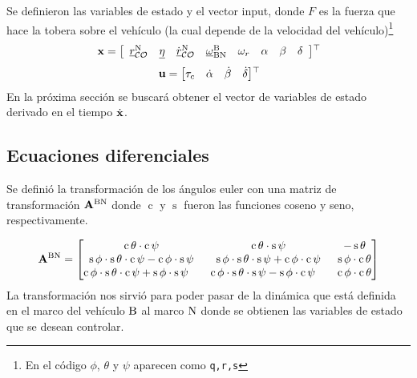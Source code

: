 \medskip

Se definieron las variables de estado y el vector input, donde $F$ es la fuerza que hace la tobera sobre el vehículo (la cual depende de la velocidad del vehículo)\footnote{En el código $\phi$, $\theta$ y $\psi$ aparecen como \texttt{q,r,s}}
\begin{equation} \label{eq:ssVariables3D}
	\mathbf{x} = \left[
	\begin{array}{cccccccc}
		{ \underline{r} }_{\mathcal{CO}}^{\mathrm{N}} & { \underline{\eta} } &\dot{{ \underline{r} }}_{\mathcal{CO}}^{\mathrm{N}} &  { \underline{\omega} }_{\mathrm{BN}}^{\mathrm{B}} & \omega_r & \alpha & \beta & \delta
	\end{array}\right] \!^{\top}\!
\end{equation}
\begin{equation}\label{eq:ssInputs3D}
	\mathbf{u} = \begin{bmatrix}
		\tau_c & \dot{\alpha} & \dot{\beta} & \dot{\delta}
	\end{bmatrix} \!^{\top}\!
\end{equation}
En la próxima sección se buscará obtener el vector de variables de estado derivado en el tiempo $\dot{\mathbf{x}}$.

\subsection{Ecuaciones diferenciales} \label{subsec:modeloMatematico}

\def\scos{\operatorname{c}}
\def\ssin{\operatorname{s}}
Se definió la transformación de los ángulos euler con una matriz de transformación $\mathbf{A}^{\mathrm{BN}}$ donde $\scos$ y $\ssin$ fueron las funciones coseno y seno, respectivamente.

\begin{equation} \label{eq:matrizTransfoVehiculo}
	\transform{BN} = \begin{bmatrix}
	\scos \theta \cdot \scos \psi & \scos \theta \cdot \ssin \psi & - \ssin \theta \\
	\ssin \phi \cdot \ssin \theta \cdot \scos \psi - \scos \phi \cdot \ssin \psi & \ssin\phi \cdot \ssin\theta \cdot \ssin\psi + \scos\phi\cdot\scos\psi & \ssin\phi \cdot \scos\theta \\
	\scos\phi \cdot \ssin\theta \cdot \scos\psi + \ssin\phi \cdot \ssin\psi\quad & \scos\phi \cdot \ssin\theta \cdot \ssin\psi - \ssin\phi \cdot \scos\psi \quad& \scos\phi \cdot \scos\theta
	\end{bmatrix}
\end{equation}
La transformación nos sirvió para poder pasar de la dinámica que está definida en el marco del vehículo $\mathrm{B}$ al marco $\mathrm{N}$ donde se obtienen las variables de estado que se desean controlar.

